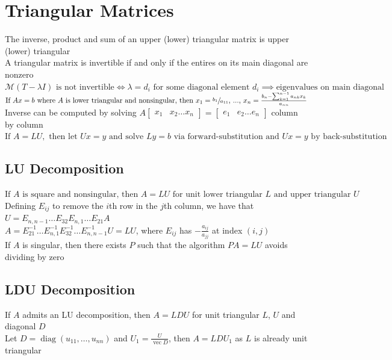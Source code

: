\documentclass{article}
\DeclareMathOperator{\diag}{diag}
\DeclareMathOperator{\vect}{vec}
\newcommand{\M}{\mathcal{M}}
\begin{document}
\section{Triangular Matrices}
The inverse, product and sum of an upper (lower) triangular matrix is upper (lower) triangular \\
A triangular matrix is invertible if and only if the entires on its main diagonal are nonzero \\
${\M(T-\lambda I) \mbox{ is not invertible} \iff \lambda = d_i \mbox{ for some diagonal element } d_i \implies \mbox{eigenvalues on main diagonal}}$ \\
$\mbox{If }Ax = b\mbox{ where }A\mbox{ is lower triangular and nonsingular, then }x_1 = \sfrac{b_1}{a_{11}}\mbox{, ..., }x_n = \frac{b_n - \sum_{k=1}^{n-1}a_{nk}x_k}{a_{nn}}$ \\
Inverse can be computed by solving $A\begin{bmatrix} x_1 & x_2 \ldots x_n\end{bmatrix} = \begin{bmatrix} e_1 & e_2 \ldots e_n\end{bmatrix}$ column by column \\
$\mbox{If }A = LU,\mbox{ then let }Ux = y\mbox{ and solve }Ly = b\mbox{ via forward-substitution and }Ux=y\mbox{ by back-substitution}$

\subsection{LU Decomposition}
$\mbox{If }A\mbox{ is square and nonsingular, then }A = LU\mbox{ for unit lower triangular } L \mbox{ and upper triangular }U$ \\
Defining $E_{ij}$ to remove the $i$th row in the $j$th column, we have that $U = E_{n, n-1}\ldots E_{32} E_{n, 1}\ldots E_{21}A$ \\
$A = E_{21}^{-1} \ldots E_{n, 1}^{-1} E_{32}^{-1} \ldots E_{n, n-1}^{-1} U = LU$, where $E_{ij}$ has $-\frac{a_{ij}}{a_{jj}}$ at index $(i, j)$ \\
If $A$ is singular, then there exists $P$ such that the algorithm $PA = LU$ avoids dividing by zero

\subsection{LDU Decomposition}
If $A$ admits an LU decomposition, then $A = LDU$ for unit triangular $L$, $U$ and diagonal $D$ \\
Let $D = \diag (u_{11}, \ldots, u_{nn})$ and $U_1 = \frac{U}{\vect D}$, then $A = LDU_1$ as $L$ is already unit triangular
\end{document}
